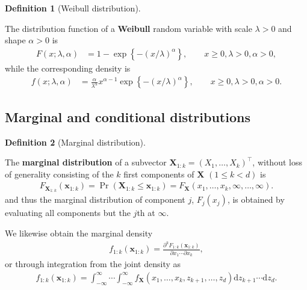 \documentclass[
  11pt,
  letterpaper,
]{scrbook}
\theoremstyle{definition}
\theoremstyle{plain}
\theoremstyle{plain}
\theoremstyle{definition}
\theoremstyle{definition}
\newtheorem{definition}{Definition}[chapter]
\theoremstyle{remark}
\begin{document}
\begin{definition}[Weibull
distribution]\protect\hypertarget{def-weibull}{}\label{def-weibull}

The distribution function of a \textbf{Weibull} random variable with
scale \(\lambda>0\) and shape \(\alpha>0\) is \begin{align*}
F(x; \lambda, \alpha) &= 1 - \exp\left\{-(x/\lambda)^\alpha\right\}, \qquad x \geq 0, \lambda>0, \alpha>0,
\end{align*} while the corresponding density is \begin{align*}
f(x; \lambda, \alpha) &= \frac{\alpha}{\lambda^\alpha} x^{\alpha-1}\exp\left\{-(x/\lambda)^\alpha\right\}, \qquad x \geq 0, \lambda>0, \alpha>0.
\end{align*}

\end{definition}

\subsection{Marginal and conditional
distributions}\label{marginal-and-conditional-distributions}

\begin{definition}[Marginal
distribution]\protect\hypertarget{def-marginal}{}\label{def-marginal}

The \textbf{marginal distribution} of a subvector
\(\boldsymbol{X}_{1:k}=(X_1, \ldots, X_k)^\top\), without loss of
generality consisting of the \(k\) first components of
\(\boldsymbol{X}\) \((1 \leq k < d)\) is \begin{align*}
 F_{\boldsymbol{X}_{1:k}}(\boldsymbol{x}_{1:k}) = \Pr(\boldsymbol{X}_{1:k} \leq \boldsymbol{x}_{1:k}) = F_{\boldsymbol{X}}(x_1, \ldots, x_k, \infty, \ldots, \infty).
\end{align*} and thus the marginal distribution of component \(j\),
\(F_j(x_j)\), is obtained by evaluating all components but the \(j\)th
at \(\infty\).

We likewise obtain the marginal density \begin{align*}
f_{1:k}(\boldsymbol{x}_{1:k}) = \frac{\partial^k F_{1:k}(\boldsymbol{x}_{1:k})}{\partial x_1 \cdots \partial x_{k}},
\end{align*} or through integration from the joint density as
\begin{align*}
 f_{1:k}(\boldsymbol{x}_{1:k}) = \int_{-\infty}^\infty \cdots  \int_{-\infty}^\infty  f_{\boldsymbol{X}}(x_1, \ldots, x_k, z_{k+1}, \ldots, z_{d}) \mathrm{d} z_{k+1} \cdots \mathrm{d}z_d.
\end{align*}

\end{definition}
\end{document}
